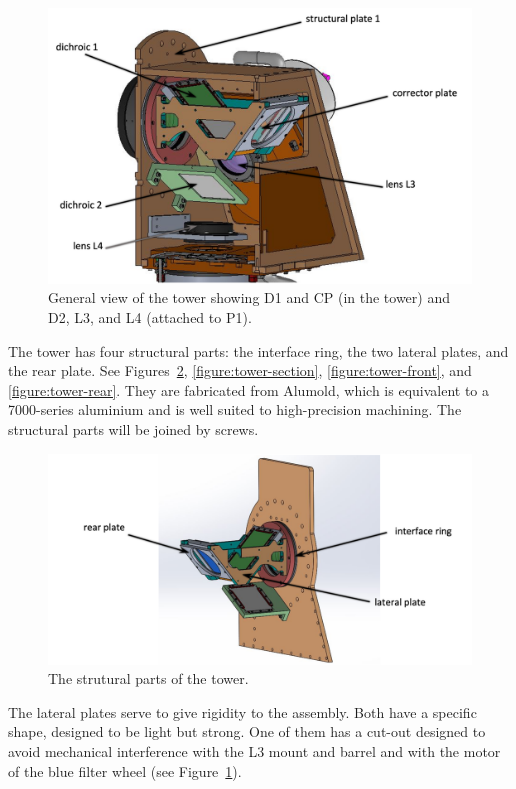 \documentclass{report}
\begin{document}
\begin{figure}
\begin{center}
\includegraphics[width=0.8\linewidth]{figures/tower-general.png}
\end{center}
\caption{General view of the tower showing D1 and CP (in the tower) and D2, L3, and L4 (attached to P1).}
\label{figure:tower-general}
\end{figure}

The tower has four structural parts: the interface ring, the two lateral plates, and the rear plate. See Figures~\ref{figure:tower-close}, \ref{figure:tower-section}, \ref{figure:tower-front}, and \ref{figure:tower-rear}. They are fabricated from Alumold, which is equivalent to a 7000-series aluminium and is well suited to high-precision machining. The structural parts will be joined by screws.

\begin{figure}
\begin{center}
\includegraphics[width=0.8\linewidth]{figures/tower-close.png}
\end{center}
\caption{The strutural parts of the tower.}
\label{figure:tower-close}
\end{figure}

The lateral plates serve to give rigidity to the assembly. Both have a specific shape, designed to be light but strong. One of them has a cut-out designed to avoid mechanical interference with the L3 mount and barrel and with the motor of the blue filter wheel (see Figure~\ref{figure:tower-general}).
\end{document}
